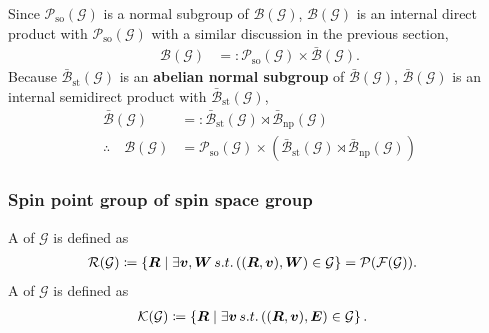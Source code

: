 Since $\mathcal{P}_{\mathrm{so}}(\mathcal{G})$ is a normal subgroup of $\mathcal{B}(\mathcal{G})$, $\mathcal{B}(\mathcal{G})$ is an internal direct product with $\mathcal{P}_{\mathrm{so}}(\mathcal{G})$ with a similar discussion in the previous section,
\begin{align}
  \mathcal{B}(\mathcal{G})
    &=: \mathcal{P}_{\mathrm{so}}(\mathcal{G}) \times \bar{\mathcal{B}}(\mathcal{G}).
\end{align}
Because $\bar{\mathcal{B}}_{\mathrm{st}}(\mathcal{G})$ is an \textbf{abelian normal subgroup} of $\bar{\mathcal{B}}(\mathcal{G})$, $\bar{\mathcal{B}}(\mathcal{G})$ is an internal semidirect product with $\bar{\mathcal{B}}_{\mathrm{st}}(\mathcal{G})$,
\begin{align}
    \bar{\mathcal{B}}(\mathcal{G})
        &=: \bar{\mathcal{B}}_{\mathrm{st}}(\mathcal{G}) \rtimes \bar{\mathcal{B}}_{\mathrm{np}}(\mathcal{G}) \\
    \therefore\quad \mathcal{B}(\mathcal{G})
        &= \mathcal{P}_{\mathrm{so}}(\mathcal{G})
        \times
        \left(
          \bar{\mathcal{B}}_{\mathrm{st}}(\mathcal{G}) \rtimes \bar{\mathcal{B}}_{\mathrm{np}}(\mathcal{G})
        \right)
\end{align}

\subsubsection{Spin point group of spin space group}

A  of $\mathcal{G}$ is defined as
\begin{align}
  \mathcal{R}(\mathcal{G})
    &\coloneqq \left\{  \bm{R}  \mathrel{}\middle|\mathrel{}  \exists \bm{v}, \bm{W} \,s.t.\, ((\bm{R}, \bm{v}), \bm{W}) \in \mathcal{G}  \right\}
    = \mathcal{P}(\mathcal{F}(\mathcal{G})).
\end{align}
A  of $\mathcal{G}$ is defined as
\begin{align}
  \mathcal{K}(\mathcal{G})
    &\coloneqq \left\{  \bm{R}  \mathrel{}\middle|\mathrel{}  \exists \bm{v} \,s.t.\, ((\bm{R}, \bm{v}), \bm{E}) \in \mathcal{G}  \right\}.
\end{align}


